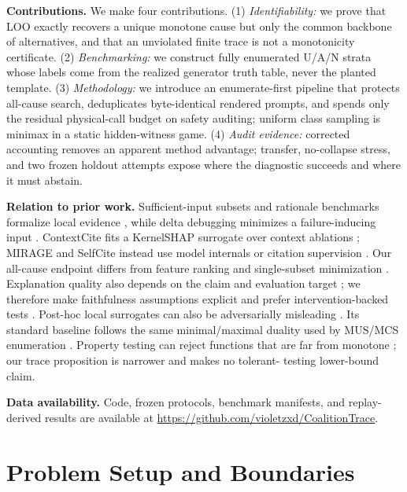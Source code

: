 \documentclass{article}
\begin{document}
\textbf{Contributions.} We make four contributions. (1) \emph{Identifiability:}
we prove that LOO exactly recovers a unique monotone cause but only the common
backbone of alternatives, and that an unviolated finite trace is not a
monotonicity certificate. (2) \emph{Benchmarking:} we construct fully enumerated
U/A/N strata whose labels come from the realized generator truth table, never
the planted template. (3) \emph{Methodology:} we introduce an enumerate-first
pipeline that protects all-cause search, deduplicates byte-identical rendered
prompts, and spends only the residual physical-call budget on safety auditing;
uniform class sampling is minimax in a static hidden-witness game. (4)
\emph{Audit evidence:} corrected accounting removes an apparent method
advantage; transfer, no-collapse stress, and two frozen holdout attempts expose
where the diagnostic succeeds and where it must abstain.

\textbf{Relation to prior work.} Sufficient-input subsets and rationale
benchmarks formalize local evidence \cite{carter2019,deyoung2020}, while delta debugging minimizes a
failure-inducing input \cite{zeller2002}. ContextCite fits a KernelSHAP
surrogate over context ablations \cite{contextcite,lundberg2017}; MIRAGE and
SelfCite instead use model internals or citation supervision
\cite{mirage,selfcite}. Our all-cause endpoint differs from feature ranking and
single-subset minimization \cite{ribeiro2016,ribeiro2018anchors,fong2017}. Explanation quality also depends
on the claim and evaluation target \cite{miller2019,lipton2018}; we therefore
make faithfulness assumptions explicit and prefer intervention-backed tests
\cite{jacovi2020,jain2019,wiegreffe2019,serrano2019,yeh2019,ghorbani2019,hooker2019}. Post-hoc local
surrogates can also be adversarially misleading \cite{slack2020}.
Its standard baseline follows the same
minimal/maximal duality used by MUS/MCS enumeration \cite{liffiton2016}.
Property testing can reject functions that are far from monotone
\cite{goldreich2000}; our trace proposition is narrower and makes no tolerant-
testing lower-bound claim.

\textbf{Data availability.} Code, frozen protocols, benchmark manifests, and
replay-derived results are available at
\url{https://github.com/violetzxd/CoalitionTrace}.

\section{Problem Setup and Boundaries}
\end{document}

